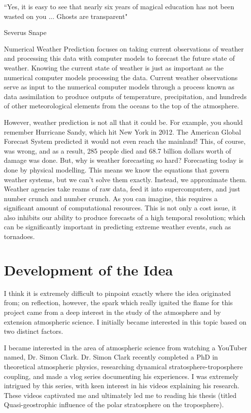 \epigraph{``Yes, it is easy to see that nearly six years of magical education has not been wasted on you ... Ghosts are transparent"}{Severus Snape}

Numerical Weather Prediction focuses on taking current observations of weather and processing this data with computer models to forecast the future state of weather. Knowing the current state of weather is just as important as the numerical computer models processing the data. Current weather observations serve as input to the numerical computer models through a process known as data assimilation to produce outputs of temperature, precipitation, and hundreds of other meteorological elements from the oceans to the top of the atmosphere\cite{nwp_introduction}. 

However, weather prediction is not all that it could be. For example, you should remember Hurricane Sandy, which hit New York in 2012. The American Global Forecast System predicted it would not even reach the mainland! This, of course, was wrong, and as a result, 285 people died and 68.7 billion dollars worth of damage was done. But, why is weather forecasting so hard? Forecasting today is done by physical modelling. This means we know the equations that govern weather systems, but we can’t solve them exactly. Instead, we approximate them.  Weather agencies take reams of raw data, feed it into supercomputers, and just number crunch and number crunch. As you can imagine, this requires a significant amount of computational resources. This is not only a cost issue, it also inhibits our ability to produce forecasts of a high temporal resolution; which can be significantly important in predicting extreme weather events, such as tornadoes.

\section{Development of the Idea}
I think it is extremely difficult to pinpoint exactly where the idea originated from; on reflection, however, the spark which really ignited the flame for this project came from a deep interest in the study of the atmosphere and by extension atmospheric science. I initially became interested in this topic based on two distinct factors. 

I became interested in the area of atmospheric science from watching a YouTuber named, Dr. Simon Clark. Dr. Simon Clark recently completed a PhD in theoretical atmospheric physics, researching dynamical stratosphere-troposphere coupling, and made a vlog series documenting his experiences. I was extremely intrigued by this series, with keen interest in his videos explaining his research. These videos captivated me and ultimately led me to reading his thesis (titled Quasi-geostrophic influence of the polar stratosphere on the troposphere)\cite{simonclark}.

